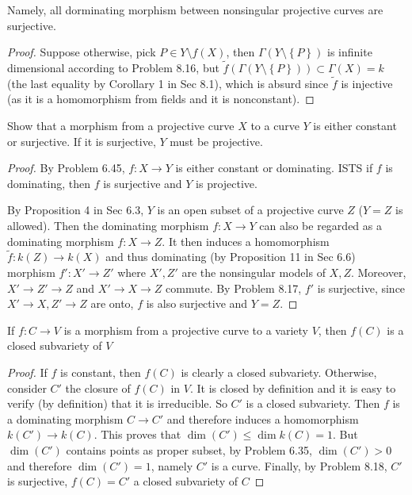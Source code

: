\documentclass{solution}
\begin{document}
Namely, all dorminating morphism between nonsingular projective curves are surjective.

\begin{proof}
    Suppose otherwise, pick $P \in Y \setminus f(X)$, then $\Gamma(Y \setminus \left\lbrace P \right\rbrace)$ is infinite dimensional according to Problem 8.16, but $\tilde{f}(\Gamma(Y \setminus \left\lbrace P \right\rbrace)) \subset \Gamma(X) = k$ (the last equality by Corollary 1 in Sec 8.1), which is absurd since $\tilde{f}$ is injective (as it is a homomorphism from fields and it is nonconstant).
\end{proof}

\begin{problem}{8.18}
    Show that a morphism from a projective curve $X$ to a curve $Y$ is either constant or surjective. If it is surjective, $Y$ must be projective.
\end{problem}

\begin{proof}
    By Problem 6.45, $f: X \rightarrow Y$ is either constant or dominating. ISTS if $f$ is dominating, then $f$ is surjective and $Y$ is projective.

    By Proposition 4 in Sec 6.3, $Y$ is an open subset of a projective curve $Z$ ($Y = Z$ is allowed). Then the dominating morphism $f: X \rightarrow Y$ can also be regarded as a dominating morphism $f: X \rightarrow Z$. It then induces a homomorphism $\tilde{f}: k(Z) \rightarrow k(X)$ and thus dominating (by Proposition 11 in Sec 6.6) morphism $f': X' \rightarrow Z'$ where $X', Z'$ are the nonsingular models of $X, Z$. Moreover, $X' \rightarrow Z' \rightarrow Z$ and $X' \rightarrow X \rightarrow Z$ commute. By Problem 8.17, $f'$ is surjective, since $X' \rightarrow X, Z' \rightarrow Z$ are onto, $f$ is also surjective and $Y = Z$.
\end{proof}

\begin{problem}{8.19}
    If $f: C \rightarrow V$ is a morphism from a projective curve to a variety $V$, then $f(C)$ is a closed subvariety of $V$
\end{problem}

\begin{proof}
    If $f$ is constant, then $f(C)$ is clearly a closed subvariety. Otherwise, consider $C'$ the closure of $f(C)$ in $V$. It is closed by definition and it is easy to verify (by definition) that it is irreducible. So $C'$ is a closed subvariety. Then $f$ is a dominating morphism $C \rightarrow C'$ and therefore induces a homomorphism $k(C') \rightarrow k(C)$. This proves that $\dim (C') \le \dim k(C) = 1$. But $\dim(C')$ contains points as proper subset, by Problem 6.35, $\dim(C') \gt 0$ and therefore $\dim (C') = 1$, namely $C'$ is a curve. Finally, by Problem 8.18, $C'$ is surjective, $f(C) = C'$ a closed subvariety of $C$
\end{proof}
\end{document}
